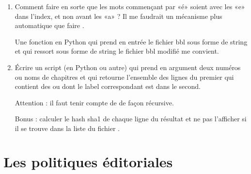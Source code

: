 \begin{enumerate}
	\item
	      Comment faire en sorte que les mots commençant par «é» soient avec les «e» dans l'index, et non avant les «a» ? Il me faudrait un mécanisme plus automatique que faire .

	      Une fonction en Python qui prend en entrée le fichier bbl sous forme de string et qui ressort sous forme de string le fichier bbl modifié me convient.


	\item
	      Écrire un script (en Python ou autre) qui prend en argument deux numéros ou noms de chapitres et qui retourne l'ensemble des lignes du premier qui contient des  ou  dont le label correspondant est dans le second.

	      Attention : il faut tenir compte de  de façon récursive.

	      Bonus : calculer le hash sha1 de chaque ligne du résultat et ne pas l'afficher si il se trouve dans la liste du fichier .
\end{enumerate}

\section{Les politiques éditoriales}
\label{SECooINTROpolitics}

